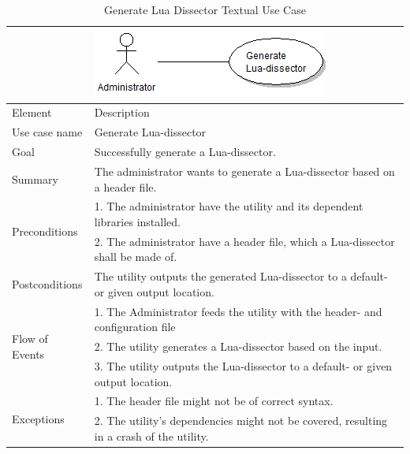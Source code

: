 \begin{table}[htbp] \footnotesize \center
\caption{Generate Lua Dissector Textual Use Case\label{tab:textual:generatelua}}
\begin{tabularx}{\textwidth}{l X}
	 & \includegraphics[scale=0.8]{./planning/img/uc_generatelua} \\
	\toprule
	Element & Description\\
	\midrule
	Use case name & Generate Lua-dissector\\
	Goal & Successfully generate a Lua-dissector. \\
	Summary & The administrator wants to generate a Lua-dissector based on a header file. \\
	\multirow{2}{*}{Preconditions} & 1. The administrator have the utility and its dependent libraries installed.  \\
	& 2. The administrator have a header file, which a Lua-dissector shall be made of. \\
	Postconditions & The utility outputs the generated Lua-dissector to a default- or given output location. \\
	\midrule
	\multirow{3}{*}{Flow of Events} & 1. The Administrator feeds the utility with the header- and configuration file\\
	& 2. The utility generates a Lua-dissector based on the input. \\
	& 3. The utility outputs the Lua-dissector to a default- or given output location.\\
	\midrule
	\multirow{2}{*}{Exceptions} & 1. The header file might not be of correct syntax.\\
	& 2. The utility's dependencies might not be covered, resulting in a crash of the utility.\\
	\bottomrule
\end{tabularx}
\end{table}

